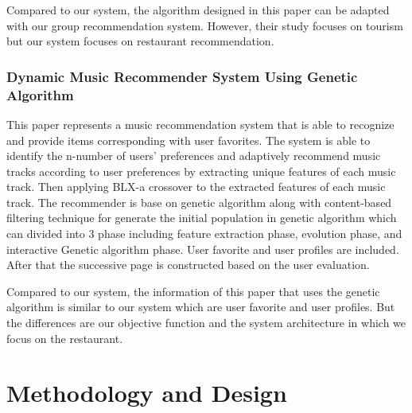 \documentclass[12pt,oneside,openright,a4paper]{cpe-english-project}
\begin{document}
Compared to our system, the algorithm designed in this paper can be adapted with our group recommendation system. However, their study focuses on tourism but our system focuses on restaurant recommendation.

\subsection{Dynamic Music Recommender System Using Genetic Algorithm}

This paper represents a music recommendation system that is able to recognize and provide items corresponding with user favorites. The system is able to identify the n-number of users' preferences and adaptively recommend music tracks according to user preferences by extracting unique features of each music track. Then applying BLX-a crossover to the extracted features of each music track. \cite{MusicRecommender} The recommender is base on genetic algorithm along with content-based filtering technique for generate the initial population in genetic algorithm which can divided into 3 phase including feature extraction phase, evolution phase, and interactive Genetic algorithm phase. User favorite and user profiles are included. After that the successive page is constructed based on the user evaluation.

Compared to our system, the information of this paper that uses the genetic algorithm is similar to our system which are user favorite and user profiles. But the differences are our objective function and the system architecture in which we focus on the restaurant.




\chapter{Methodology and Design}
\end{document}

